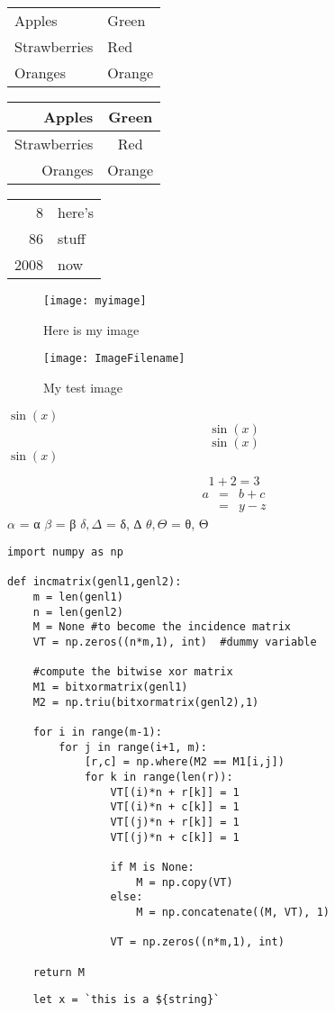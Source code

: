 \documentclass[a4paper,12pt]{article}
\begin{document}
\begin{tabular}{|l|l|}
Apples & Green \\
Strawberries & Red \\
Oranges & Orange \\
\end{tabular}
\begin{tabular}{rc}
Apples & Green \\
\hline
Strawberries & Red \\
\cline{1-1}
Oranges & Orange \\
\end{tabular}
\begin{tabular}{|r|l|}
\hline
8 & here’s \\
\cline{2-2}
86 & stuff \\
\hline \hline
2008 & now \\
\hline
\end{tabular}

\begin{figure}[h]
\centering
\texttt{[image: myimage]}
\caption{Here is my image}
\label{image-myimage}
\end{figure}

\begin{figure}[h!]
\centering
\texttt{[image: ImageFilename]}
\caption{My test image}
\end{figure}

$\sin(x)$
$$\sin(x)$$
\[\sin(x)\]
\(\sin(x)\)

\begin{equation}1+2=3\end{equation}
\begin{eqnarray}
  a & = & b + c \\
    & = & y - z
\end{eqnarray}
$\alpha$ = α
$\beta$ = β
$\delta, \Delta$ = δ, ∆
$\theta, \Theta$ = θ, Θ

\begin{comment}
This is a comments.
\end{comment}

\begin{verbatim}
import numpy as np
 
def incmatrix(genl1,genl2):
    m = len(genl1)
    n = len(genl2)
    M = None #to become the incidence matrix
    VT = np.zeros((n*m,1), int)  #dummy variable
 
    #compute the bitwise xor matrix
    M1 = bitxormatrix(genl1)
    M2 = np.triu(bitxormatrix(genl2),1) 
 
    for i in range(m-1):
        for j in range(i+1, m):
            [r,c] = np.where(M2 == M1[i,j])
            for k in range(len(r)):
                VT[(i)*n + r[k]] = 1
                VT[(i)*n + c[k]] = 1
                VT[(j)*n + r[k]] = 1
                VT[(j)*n + c[k]] = 1
 
                if M is None:
                    M = np.copy(VT)
                else:
                    M = np.concatenate((M, VT), 1)
 
                VT = np.zeros((n*m,1), int)
 
    return M
\end{verbatim}


\lstset{language=JavaScript}
\begin{lstlisting}
    let x = `this is a ${string}`
\end{lstlisting}
\end{document}
